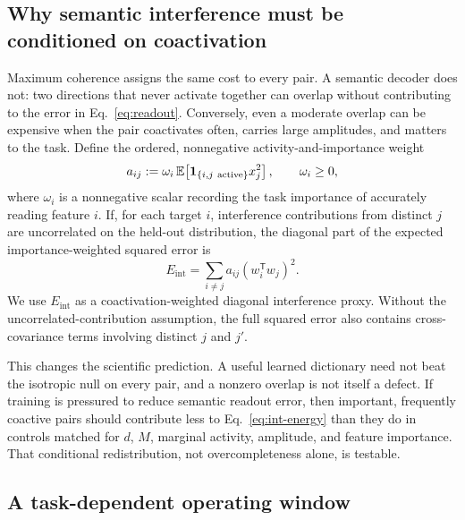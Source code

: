 \documentclass[
  aps,
  reprint,
  superscriptaddress,
  floatfix,
  nofootinbib,
  longbibliography
]{revtex4-2}
\newcommand{\E}{\mathbb{E}}
\newcommand{\Msem}{M}
\newcommand{\Eint}{E_{\mathrm{int}}}
\newcommand{\T}{^{\mathsf{T}}}
\begin{document}
\subsection{Why semantic interference must be conditioned on coactivation}
\label{sec:coactivation-diagnostic}

Maximum coherence assigns the same cost to every pair.  A semantic decoder
does not: two directions that never activate together can overlap without
contributing to the error in Eq.~\eqref{eq:readout}.  Conversely, even a
moderate overlap can be expensive when the pair coactivates often, carries
large amplitudes, and matters to the task.  Define the ordered, nonnegative
activity-and-importance weight
\begin{equation}
\label{eq:coactivation}
a_{ij}
:=
\omega_i\,\E\!\left[
\mathbf 1_{\{i,j\ {\rm active}\}}x_j^2
\right],
\qquad \omega_i\geq0,
\end{equation}
where $\omega_i$ is a nonnegative scalar recording the task importance of accurately reading feature
$i$.  If, for each target $i$, interference contributions from distinct $j$
are uncorrelated on the held-out distribution, the diagonal part of the
expected importance-weighted squared error is
\begin{equation}
\label{eq:int-energy}
\Eint
=
\sum_{i\ne j}
a_{ij}(w_i\T w_j)^2.
\end{equation}
We use $\Eint$ as a coactivation-weighted diagonal interference proxy.  Without
the uncorrelated-contribution assumption, the full squared error also contains
cross-covariance terms involving distinct $j$ and $j'$.

This changes the scientific prediction.  A useful learned dictionary need
not beat the isotropic null on every pair, and a nonzero overlap is not itself
a defect.  If training is pressured to reduce semantic readout error, then
important, frequently coactive pairs should contribute less to
Eq.~\eqref{eq:int-energy} than they do in controls matched for $d$, $\Msem$,
marginal activity, amplitude, and feature importance.  That conditional
redistribution, not overcompleteness alone, is testable.

\subsection{A task-dependent operating window}
\label{sec:operating-criterion}
\end{document}
